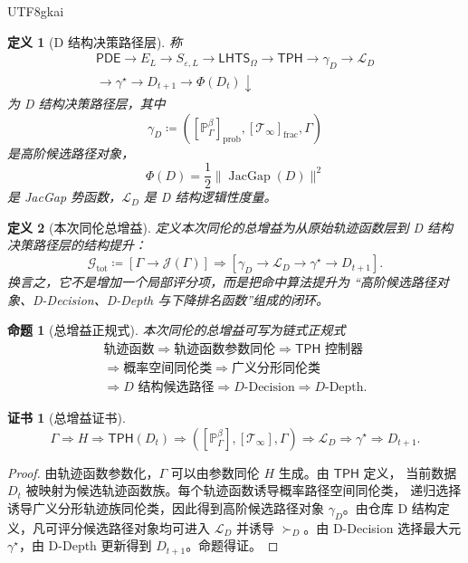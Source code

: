 \documentclass[12pt]{article}
\newtheorem{definition}{定义}[section]
\newtheorem{proposition}{命题}[section]
\newtheorem{Certificate}{证书}[section]
\newcommand{\LHTS}{\ensuremath{\mathsf{LHTS}}}
\newcommand{\TPH}{\ensuremath{\mathsf{TPH}}}
\newcommand{\PDE}{\ensuremath{\mathsf{PDE}}}
\newcommand{\DefEq}{\coloneqq}
\DeclareMathOperator{\JacGap}{JacGap}
\begin{document}
\begin{CJK*}{UTF8}{gkai}
\begin{definition}[D 结构决策路径层]
称
\[
\begin{gathered}
\PDE
\to
E_L
\to
S_{\varepsilon,L}
\to
\LHTS_\Omega
\to
\TPH
\to
\gamma_D
\to
\mathcal L_D
\\
\to
\gamma^\star
\to
D_{t+1}
\to
\Phi(D_t)\downarrow
\end{gathered}
\]
为 D 结构决策路径层，其中
\[
\boxed{
\gamma_D
\DefEq
\left(
[\mathbb P_\Gamma^\beta]_{\mathrm{prob}},
[\mathcal T_\infty]_{\mathrm{frac}},
\Gamma
\right)
}
\]
是高阶候选路径对象，
\[
\Phi(D)=\frac12\|\JacGap(D)\|^2
\]
是 JacGap 势函数，\(\mathcal L_D\) 是 D 结构逻辑性度量。
\end{definition}

\begin{definition}[本次同伦总增益]
定义本次同伦的总增益为从原始轨迹函数层到 D 结构决策路径层的结构提升：
\[
\boxed{
\mathcal G_{\mathrm{tot}}
\DefEq
\left[
\Gamma\to \mathcal J(\Gamma)
\right]
\Longrightarrow
\left[
\gamma_D\to \mathcal L_D\to \gamma^\star\to D_{t+1}
\right].
}
\]
换言之，它不是增加一个局部评分项，而是把命中算法提升为
“高阶候选路径对象、D-Decision、D-Depth 与下降排名函数”组成的闭环。
\end{definition}

\begin{proposition}[总增益正规式]
本次同伦的总增益可写为链式正规式
\[
\boxed{
\begin{gathered}
\text{轨迹函数}
\Rightarrow
\text{轨迹函数参数同伦}
\Rightarrow
\TPH\text{ 控制器}
\\
\Rightarrow
\text{概率空间同伦类}
\Rightarrow
\text{广义分形同伦类}
\\
\Rightarrow
D\text{ 结构候选路径}
\Rightarrow
D\text{-Decision}
\Rightarrow
D\text{-Depth}.
\end{gathered}
}
\]
\end{proposition}

\begin{Certificate}[总增益证书]
\[
\boxed{
\Gamma
\Rightarrow
H
\Rightarrow
\TPH(D_t)
\Rightarrow
([\mathbb P_\Gamma^\beta],[\mathcal T_\infty],\Gamma)
\Rightarrow
\mathcal L_D
\Rightarrow
\gamma^\star
\Rightarrow
D_{t+1}.
}
\]
\end{Certificate}

\begin{proof}
由轨迹函数参数化，\(\Gamma\) 可以由参数同伦 \(H\) 生成。由 \(\TPH\) 定义，
当前数据 \(D_t\) 被映射为候选轨迹函数族。每个轨迹函数诱导概率路径空间同伦类，
递归选择诱导广义分形轨迹族同伦类，因此得到高阶候选路径对象
\(\gamma_D\)。由仓库 D 结构定义，凡可评分候选路径对象均可进入
\(\mathcal L_D\) 并诱导 \(\succ_D\)。由 D-Decision 选择最大元
\(\gamma^\star\)，由 D-Depth 更新得到 \(D_{t+1}\)。命题得证。
\end{proof}


\end{CJK*}
\end{document}
